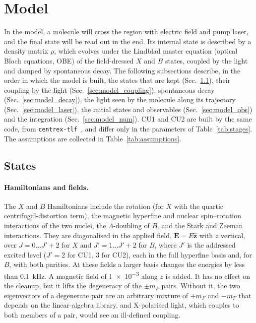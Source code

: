 \documentclass[11pt,a4paper,oneside]{report}
\newcommand{\code}[1]{\texttt{#1}}
\begin{document}
\section{Model}
\label{sec:model}

In the model, a molecule will cross the region with electric field and pump laser, and the final state will be read out in the end. Its
internal state is described by a density matrix $\rho$, which evolves under the Lindblad master
equation (optical Bloch equations, OBE) of the field-dressed $X$ and $B$ states, coupled by the
light and damped by spontaneous decay. The following subsections describe, in the order in which the
model is built, the states that are kept (Sec.~\ref{sec:model_states}), their coupling by the light
(Sec.~\ref{sec:model_coupling}), spontaneous decay (Sec.~\ref{sec:model_decay}), the light seen by
the molecule along its trajectory (Sec.~\ref{sec:model_laser}), the initial states and observables
(Sec.~\ref{sec:model_obs}) and the integration (Sec.~\ref{sec:model_num}). CU1 and CU2 are built by
the same code, from \code{centrex-tlf}~\cite{centrextlf}, and differ only in the parameters of
Table~\ref{tab:stages}. The assumptions are collected in Table~\ref{tab:assumptions}.

\subsection{States}
\label{sec:model_states}

\paragraph{Hamiltonians and fields.} The $X$ and $B$ Hamiltonians include the rotation (for $X$ with
the quartic centrifugal-distortion term), the magnetic hyperfine and nuclear spin--rotation
interactions of the two nuclei, the $\Lambda$-doubling of $B$, and the Stark and Zeeman interactions.
They are diagonalised in the applied field, $\mathbf E=E\hat{\mathbf z}$ with $z$ vertical, over
$J=0\ldots J'+2$ for $X$ and $J'=1\ldots J'+2$ for $B$, where $J'$ is the addressed excited level
($J'=2$ for CU1, 3 for CU2), each in the full hyperfine basis and, for $B$, with both parities. At
these fields a larger basis changes the energies by less than \SI{0.1}{kHz}. A magnetic field of
\SI{1e-3}{\gauss} along $z$ is added. It has no effect on the cleanup, but it lifts the degeneracy of
the $\pm m_F$ pairs. Without it, the two eigenvectors of a degenerate pair are an arbitrary mixture
of $+m_F$ and $-m_F$ that depends on the linear-algebra library, and X-polarised light, which couples
to both members of a pair, would see an ill-defined coupling.
\end{document}
